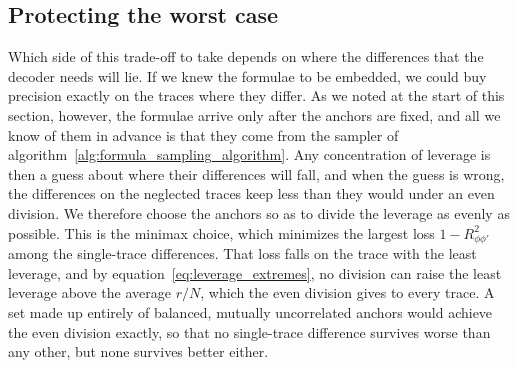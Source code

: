 \documentclass[titlepage,a4paper,11pt]{report}
\begin{document}
    \subsection{Protecting the worst case}\label{sec:protecting_the_worst_case}
    Which side of this trade-off to take depends on where the differences that the decoder needs will lie. If we knew the formulae to be embedded, we could buy precision exactly on the traces where they differ. As we noted at the start of this section, however, the formulae arrive only after the anchors are fixed, and all we know of them in advance is that they come from the sampler of algorithm~\ref{alg:formula_sampling_algorithm}. Any concentration of leverage is then a guess about where their differences will fall, and when the guess is wrong, the differences on the neglected traces keep less than they would under an even division. We therefore choose the anchors so as to divide the leverage as evenly as possible. This is the minimax choice, which minimizes the largest loss $1-R^2_{\phi\phi'}$ among the single-trace differences. That loss falls on the trace with the least leverage, and by equation~\eqref{eq:leverage_extremes}, no division can raise the least leverage above the average $r/N$, which the even division gives to every trace. A set made up entirely of balanced, mutually uncorrelated anchors would achieve the even division exactly, so that no single-trace difference survives worse than any other, but none survives better either.
\end{document}
